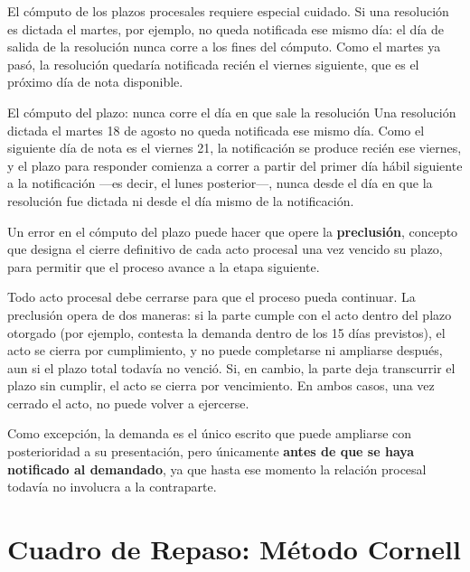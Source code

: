 \documentclass[12pt,oneside]{book}
\begin{document}
El cómputo de los plazos procesales requiere especial cuidado. Si una resolución es dictada el martes, por ejemplo, no queda notificada ese mismo día: el día de salida de la resolución nunca corre a los fines del cómputo. Como el martes ya pasó, la resolución quedaría notificada recién el viernes siguiente, que es el próximo día de nota disponible.

\begin{example}{El cómputo del plazo: nunca corre el día en que sale la resolución}
Una resolución dictada el martes 18 de agosto no queda notificada ese mismo día. Como el siguiente día de nota es el viernes 21, la notificación se produce recién ese viernes, y el plazo para responder comienza a correr a partir del primer día hábil siguiente a la notificación ---es decir, el lunes posterior---, nunca desde el día en que la resolución fue dictada ni desde el día mismo de la notificación.
\end{example}

Un error en el cómputo del plazo puede hacer que opere la \textbf{preclusión}, concepto que designa el cierre definitivo de cada acto procesal una vez vencido su plazo, para permitir que el proceso avance a la etapa siguiente.

\begin{important}
Todo acto procesal debe cerrarse para que el proceso pueda continuar. La preclusión opera de dos maneras: si la parte cumple con el acto dentro del plazo otorgado (por ejemplo, contesta la demanda dentro de los 15 días previstos), el acto se cierra por cumplimiento, y no puede completarse ni ampliarse después, aun si el plazo total todavía no venció. Si, en cambio, la parte deja transcurrir el plazo sin cumplir, el acto se cierra por vencimiento. En ambos casos, una vez cerrado el acto, no puede volver a ejercerse.

Como excepción, la demanda es el único escrito que puede ampliarse con posterioridad a su presentación, pero únicamente \textbf{antes de que se haya notificado al demandado}, ya que hasta ese momento la relación procesal todavía no involucra a la contraparte.
\end{important}


\chapter{Cuadro de Repaso: Método Cornell}
\end{document}
